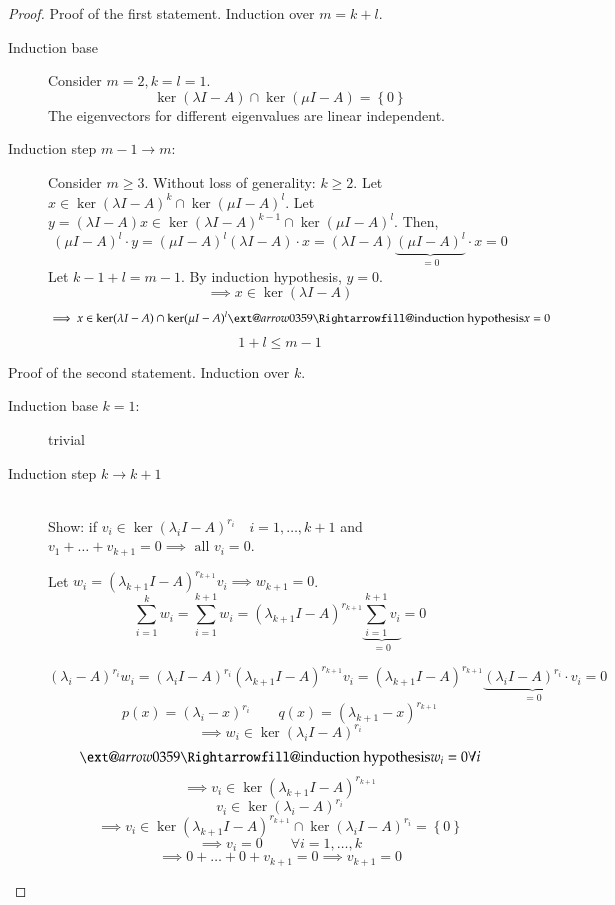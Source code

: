 \documentclass{article}
\makeatletter
\numberwithin{lecref}{section}
\newcommand{\set}[1]{\left\{#1\right\}}
\newcommand{\xRightarrow}[2][]{\ext@arrow 0359\Rightarrowfill@{#1}{#2}}
\makeatother
\begin{document}
\begin{proof}
  Proof of the first statement. Induction over $m = k + l$.
  \begin{description}
    \item[Induction base] 
      Consider $m = 2, k = l = 1$.
      \[ \ker(\lambda I - A) \cap \ker(\mu I - A) = \set{0} \]
      The eigenvectors for different eigenvalues are linear independent.
    \item[Induction step $m-1 \to m$:]
      Consider $m \geq 3$. Without loss of generality: $k \geq 2$.
      Let $x \in \ker(\lambda I - A)^k \cap \ker(\mu I - A)^l$.
      Let $y = (\lambda I - A)x \in \ker(\lambda I - A)^{k-1} \cap \ker(\mu I - A)^l$. Then,
      \[ (\mu I - A)^l \cdot y = (\mu I - A)^l (\lambda I - A) \cdot x = (\lambda I - A) \underbrace{(\mu I - A)^l}_{=0} \cdot x = 0 \]
      Let $k - 1 + l = m - 1$.
      By induction hypothesis, $y = 0$.
      \[ \implies x \in \ker(\lambda I - A) \]
      \[ \implies x \in \ker(\lambda I - A) \cap \ker(\mu I - A)^l \xRightarrow{\text{induction hypothesis}} x = 0 \]
      \[ 1 + l \leq m - 1 \]
  \end{description}

  Proof of the second statement. Induction over $k$.
  \begin{description}
    \item[Induction base $k = 1$:] trivial
    \item[Induction step $k \to k+1$] \hfill{} \\
      Show: if $v_i \in \ker(\lambda_i I - A)^{r_i} \quad i = 1, \dots, k+1$ and $v_1 + \dots + v_{k+1} = 0
      \implies \text{ all } v_i = 0$.

      Let $w_i = (\lambda_{k+1} I - A)^{r_{k+1}} v_i \implies w_{k+1} = 0$.
      \[ \sum_{i=1}^k w_i = \sum_{i=1}^{k+1} w_i = (\lambda_{k+1} I - A)^{r_{k+1}} \underbrace{\sum_{i=1}^{k+1} v_i}_{=0} = 0 \]

      \[ (\lambda_i - A)^{r_i} w_i = (\lambda_i I - A)^{r_i} (\lambda_{k+1} I - A)^{r_{k+1}} v_i = (\lambda_{k+1} I - A)^{r_{k+1}} \underbrace{(\lambda_i I - A)^{r_i} \cdot v_i}_{=0} = 0 \]
      \[ p(x) = (\lambda_i - x)^{r_i} \qquad q(x) = (\lambda_{k+1} - x)^{r_{k+1}} \]
      \[ \implies w_i \in \ker(\lambda_i I - A)^{r_i} \]
      \[ \xRightarrow{\text{induction hypothesis}} w_i = 0 \forall i \]
      \[ \implies v_i \in \ker(\lambda_{k+1} I - A)^{r_{k+1}} \]
      \[ v_i \in \ker(\lambda_i - A)^{r_i} \]
      \[ \implies v_i \in \ker(\lambda_{k+1} I - A)^{r_{k+1}} \cap \ker(\lambda_i I - A)^{r_i} = \set{0} \]
      \[ \implies v_i = 0 \qquad \forall i = 1, \dots, k \]
      \[ \implies 0 + \dots + 0 + v_{k+1} = 0 \implies v_{k+1} = 0 \]
  \end{description}
\end{proof}
\end{document}

